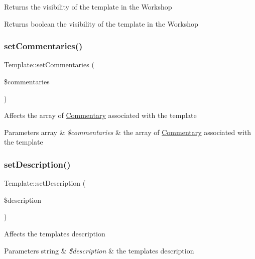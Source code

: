 Returns the visibility of the template in the Workshop \begin{DoxyReturn}{Returns}
boolean the visibility of the template in the Workshop 
\end{DoxyReturn}
\mbox{\label{classTemplate_a728d161f42ea44d56892b770e3632dd3}} 
\subsubsection{\texorpdfstring{set\+Commentaries()}{setCommentaries()}}
{\footnotesize\ttfamily Template\+::set\+Commentaries (\begin{DoxyParamCaption}\item[{}]{\$commentaries }\end{DoxyParamCaption})}

Affects the array of \hyperlink{classCommentary}{Commentary} associated with the template 
\begin{DoxyParams}[1]{Parameters}
array & {\em \$commentaries} & the array of \hyperlink{classCommentary}{Commentary} associated with the template \\
\hline
\end{DoxyParams}
\mbox{\label{classTemplate_ad37dd133737b316378f6ed9df5c5f79a}} 
\subsubsection{\texorpdfstring{set\+Description()}{setDescription()}}
{\footnotesize\ttfamily Template\+::set\+Description (\begin{DoxyParamCaption}\item[{}]{\$description }\end{DoxyParamCaption})}

Affects the template\textquotesingle{}s description 
\begin{DoxyParams}[1]{Parameters}
string & {\em \$description} & the template\textquotesingle{}s description \\
\hline
\end{DoxyParams}
\mbox{\label{classTemplate_a5a321f8d11252c5b1a23d3e3ddde66e6}} 
